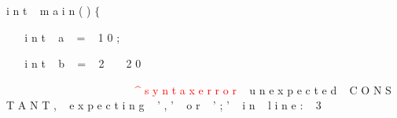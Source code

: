 \documentclass[8, usernames, dvipsnames]{beamer}
\begin{document}
\begin{frame} 
\textcolor{PineGreen}{i}
\textcolor{PineGreen}{n}
\textcolor{PineGreen}{t}
\textcolor{White}{\ }
\textcolor{PineGreen}{m}
\textcolor{PineGreen}{a}
\textcolor{PineGreen}{i}
\textcolor{PineGreen}{n}
\textcolor{PineGreen}{(}
\textcolor{PineGreen}{)}
\textcolor{PineGreen}{$\{$}

\textcolor{White}{\ }
\textcolor{White}{\ }
\textcolor{PineGreen}{i}
\textcolor{PineGreen}{n}
\textcolor{PineGreen}{t}
\textcolor{White}{\ }
\textcolor{PineGreen}{a}
\textcolor{White}{\ }
\textcolor{PineGreen}{=}
\textcolor{White}{\ }
\textcolor{PineGreen}{1}
\textcolor{PineGreen}{0}
\textcolor{PineGreen}{;}

\textcolor{White}{\ }
\textcolor{White}{\ }
\textcolor{PineGreen}{i}
\textcolor{PineGreen}{n}
\textcolor{PineGreen}{t}
\textcolor{White}{\ }
\textcolor{PineGreen}{b}
\textcolor{White}{\ }
\textcolor{PineGreen}{=}
\textcolor{White}{\ }
\textcolor{PineGreen}{2}
\textcolor{White}{\ }
\textcolor{White}{\ }
\textcolor{PineGreen}{2}
\textcolor{PineGreen}{0}

\textcolor{White}{\ }
\textcolor{White}{\ }
\textcolor{White}{\ }
\textcolor{White}{\ }
\textcolor{White}{\ }
\textcolor{White}{\ }
\textcolor{White}{\ }
\textcolor{White}{\ }
\textcolor{White}{\ }
\textcolor{White}{\ }
\textcolor{White}{\ }
\textcolor{White}{\ }
\textcolor{White}{\ }
\textcolor{White}{\ }
\textcolor{Red}{\textasciicircum}
\textcolor{Red}{
}
\textcolor{Red}{s}
\textcolor{Red}{y}
\textcolor{Red}{n}
\textcolor{Red}{t}
\textcolor{Red}{a}
\textcolor{Red}{x}
\textcolor{Red}{ }
\textcolor{Red}{e}
\textcolor{Red}{r}
\textcolor{Red}{r}
\textcolor{Red}{o}
\textcolor{Red}{r}
\textcolor{White}{\ }
\textcolor{PineGreen}{u}
\textcolor{PineGreen}{n}
\textcolor{PineGreen}{e}
\textcolor{PineGreen}{x}
\textcolor{PineGreen}{p}
\textcolor{PineGreen}{e}
\textcolor{PineGreen}{c}
\textcolor{PineGreen}{t}
\textcolor{PineGreen}{e}
\textcolor{PineGreen}{d}
\textcolor{White}{\ }
\textcolor{PineGreen}{C}
\textcolor{PineGreen}{O}
\textcolor{PineGreen}{N}
\textcolor{PineGreen}{S}
\textcolor{PineGreen}{T}
\textcolor{PineGreen}{A}
\textcolor{PineGreen}{N}
\textcolor{PineGreen}{T}
\textcolor{PineGreen}{,}
\textcolor{White}{\ }
\textcolor{PineGreen}{e}
\textcolor{PineGreen}{x}
\textcolor{PineGreen}{p}
\textcolor{PineGreen}{e}
\textcolor{PineGreen}{c}
\textcolor{PineGreen}{t}
\textcolor{PineGreen}{i}
\textcolor{PineGreen}{n}
\textcolor{PineGreen}{g}
\textcolor{White}{\ }
\textcolor{PineGreen}{'}
\textcolor{PineGreen}{,}
\textcolor{PineGreen}{'}
\textcolor{White}{\ }
\textcolor{PineGreen}{o}
\textcolor{PineGreen}{r}
\textcolor{White}{\ }
\textcolor{PineGreen}{'}
\textcolor{PineGreen}{;}
\textcolor{PineGreen}{'}
\textcolor{White}{\ }
\textcolor{PineGreen}{i}
\textcolor{PineGreen}{n}
\textcolor{White}{\ }
\textcolor{PineGreen}{l}
\textcolor{PineGreen}{i}
\textcolor{PineGreen}{n}
\textcolor{PineGreen}{e}
\textcolor{PineGreen}{:}
\textcolor{White}{\ }
\textcolor{PineGreen}{3}


\end{frame}
\end{document}
